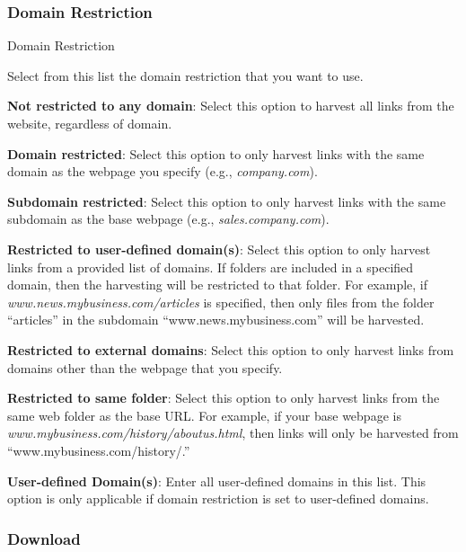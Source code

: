 \documentclass[
]{book}
\newenvironment{optionssection}
    {
    \begin{tcolorbox}[colframe=lightgray,colback=ultralightgray,sharp corners=all,parbox=false]
    }
    {
    \end{tcolorbox}
    }
\newenvironment{optionssectiontitle}
    {
    \begin{tcolorbox}[colframe=lightgray,colback=lightgray]
    \bfseries
    }
    {
    \end{tcolorbox}
    }
\theoremstyle{definition}
\theoremstyle{definition}
\theoremstyle{definition}
\theoremstyle{definition}
\theoremstyle{remark}
\begin{document}
\hypertarget{domain-restriction}{%
\subsubsection*{Domain Restriction}\label{domain-restriction}}

\begin{optionssection}

\begin{optionssectiontitle}
Domain Restriction

\end{optionssectiontitle}

Select from this list the domain restriction that you want to use.

\textbf{Not restricted to any domain}: Select this option to harvest all links from the website, regardless of domain.

\textbf{Domain restricted}: Select this option to only harvest links with the same domain as the webpage you specify (e.g., \emph{company.com}).

\textbf{Subdomain restricted}: Select this option to only harvest links with the same subdomain as the base webpage (e.g., \emph{sales.company.com}).

\textbf{Restricted to user-defined domain(s)}: Select this option to only harvest links from a provided list of domains. If folders are included in a specified domain, then the harvesting will be restricted to that folder. For example, if \emph{www.news.mybusiness.com/articles} is specified, then only files from the folder ``articles'' in the subdomain ``www.news.mybusiness.com'' will be harvested.

\textbf{Restricted to external domains}: Select this option to only harvest links from domains other than the webpage that you specify.

\textbf{Restricted to same folder}: Select this option to only harvest links from the same web folder as the base URL. For example, if your base webpage is \emph{www.mybusiness.com/history/aboutus.html}, then links will only be harvested from ``www.mybusiness.com/history/.''

\end{optionssection}

\textbf{User-defined Domain(s)}: Enter all user-defined domains in this list. This option is only applicable if domain restriction is set to user-defined domains.

\hypertarget{download}{%
\subsubsection*{Download}\label{download}}
\end{document}
